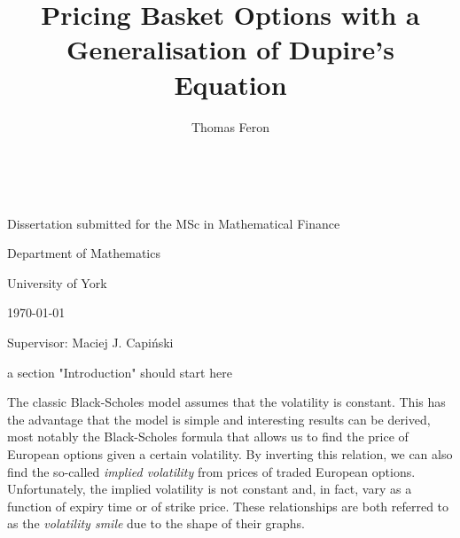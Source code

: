 \documentclass[english]{article}
\newcommand{\comment}[1]{\color{blue}#1\color{black}}
\numberwithin{equation}{section}
\numberwithin{figure}{section}
\theoremstyle{bolddescit}
\theoremstyle{definition}
\theoremstyle{definition}
\theoremstyle{plain}
\theoremstyle{plain}
\theoremstyle{bolddesc}
\theoremstyle{plain}
\theoremstyle{remark}
\begin{document}
\title{Pricing Basket Options with a Generalisation of Dupire's Equation}
\author{Thomas Feron}
\date{~}

\maketitle
\vspace{2.5in}

\noindent \begin{center}
Dissertation submitted for the MSc in Mathematical Finance
\par\end{center}

\begin{center}
\bigskip{}
\par\end{center}

\begin{center}
Department of Mathematics

University of York\bigskip{}
\par\end{center}

\begin{center}
\today
\par\end{center}

\vspace{1in}

\begin{center}
Supervisor: Maciej J. Capi\'nski
\par\end{center}

\newpage{}

\tableofcontents{}\newpage{}

\pagebreak

\comment{a section "Introduction" should start here }

The classic Black-Scholes model assumes that the volatility is constant. This has the advantage that the model is simple and interesting results can be derived, most notably the Black-Scholes formula that allows us to find the price of European options given a certain volatility. By inverting this relation, we can also find the so-called \textit{implied volatility} from prices of traded European options. Unfortunately, the implied volatility is not constant and, in fact, vary as a function of expiry time or of strike price. These relationships are both referred to as the \textit{volatility smile} due to the shape of their graphs.
\end{document}
